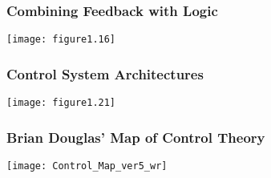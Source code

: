 \documentclass{beamer-control}
\begin{document}
\begin{frame}
\frametitle{Combining Feedback with Logic }
\texttt{[image: figure1.16]}
\end{frame}

\begin{frame}
\frametitle{Control System Architectures }
\centering
\texttt{[image: figure1.21]}
\end{frame}

\begin{frame}
\frametitle{Brian Douglas' Map of Control Theory}
\centering
\texttt{[image: Control\_Map\_ver5\_wr]}
\end{frame}

\SUMMARYFRAME
\FINALE
\end{document}

